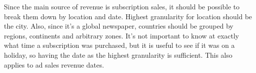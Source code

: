 
Since the main source of revenue is subscription sales, it should be possible to break them down by location and date. Highest granularity for location should be the city. Also, since it’s a global newspaper, countries should be grouped by regions, continents and arbitrary zones. It’s not important to know at exactly what time a subscription was purchased, but it is useful to see if it was on a holiday, so having the date as the highest granularity is sufficient. This also applies to ad sales revenue dates.

